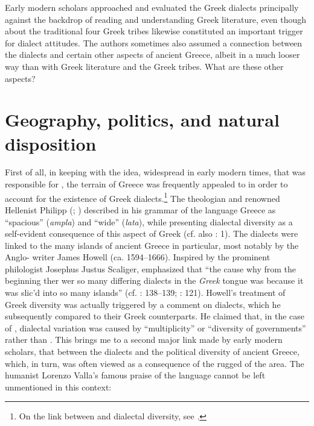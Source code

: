 Early modern scholars approached and evaluated the Greek dialects principally against the backdrop of reading and understanding Greek literature, even though  about the traditional four Greek tribes likewise constituted an important trigger for dialect attitudes. The authors sometimes also assumed a connection between the dialects and certain other aspects of ancient Greece, albeit in a much looser way than with Greek literature and the Greek tribes. What are these other aspects?

\section{Geography, politics, and natural disposition}\label{sec:7.5}


First of all, in keeping with the idea, widespread in early modern times, that  was responsible for , the terrain of Greece was frequently appealed to in order to account for the existence of Greek dialects.\footnote{On the link between  and dialectal diversity, see \citet[]{VanRooyFcd}.} The  theologian and renowned Hellenist Philipp \citeauthor{Melanchthon1518} (\citeyear[a.1\textsc{\textsuperscript{v}}]{Melanchthon1518}; \citeyear[\textsc{a.}i\textsc{\textsuperscript{v}}]{Melanchthon1520}) described in his grammar of the language Greece as “spacious” (\textit{ampla}) and “wide” (\textit{lata}), while presenting dialectal diversity as a self-evident consequence of this aspect of Greek  (cf. also \citealt{Ruland1556}: 1). The dialects were linked to the many islands of ancient Greece in particular, most notably by the Anglo- writer James Howell (ca. 1594–1666). Inspired by the prominent philologist Josephus Justus Scaliger, \citet[89]{Howell1650b} emphasized that “the cause why from the beginning ther wer so many differing dialects in the \textit{Greek} tongue was because it was slic’d into so many islands” (cf. \citealt{Howell1642}: 138–139; \citealt{Scaliger1610}: 121). Howell’s treatment of Greek diversity was actually triggered by a comment on  dialects, which he subsequently compared to their Greek counterparts. He claimed that, in the case of , dialectal variation was caused by “multiplicity” or “diversity of governments” rather than . This brings me to a second major link made by early modern scholars, that between the dialects and the political diversity of ancient Greece, which, in turn, was often viewed as a consequence of the rugged  of the area. The humanist Lorenzo Valla’s famous praise of the  language cannot be left unmentioned in this context:

